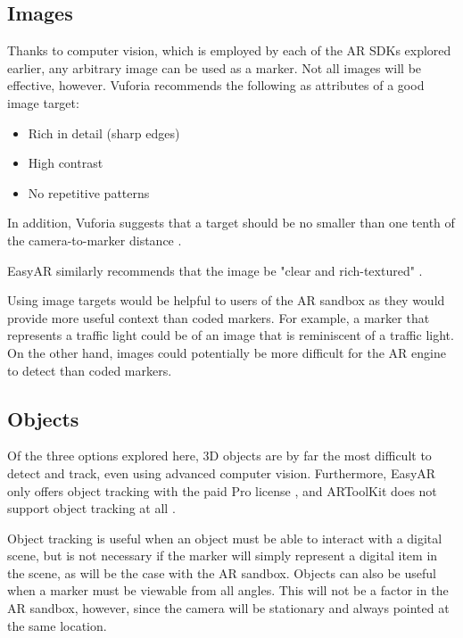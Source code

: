 \documentclass[letterpaper, 10pt, onecolumn, draftclsnofoot]{IEEEtran}
\begin{document}
\subsection{Images}
Thanks to computer vision, which is employed by each of the AR SDKs explored earlier, any arbitrary image can be used as a marker. Not all images will be effective, however. Vuforia recommends the following as attributes of a good image target:
\begin{itemize}
    \item Rich in detail (sharp edges)
    \item High contrast
    \item No repetitive patterns
\end{itemize}
In addition, Vuforia suggests that a target should be no smaller than one tenth of the camera-to-marker distance \cite{vuforia-images}.

EasyAR similarly recommends that the image be "clear and rich-textured" \cite{easyar-images}.

Using image targets would be helpful to users of the AR sandbox as they would provide more useful context than coded markers. For example, a marker that represents a traffic light could be of an image that is reminiscent of a traffic light. On the other hand, images could potentially be more difficult for the AR engine to detect than coded markers.

\subsection{Objects}
Of the three options explored here, 3D objects are by far the most difficult to detect and track, even using advanced computer vision. Furthermore, EasyAR only offers object tracking with the paid Pro license \cite{easyar-prices}, and ARToolKit does not support object tracking at all \cite{artoolkit-features}.

Object tracking is useful when an object must be able to interact with a digital scene, but is not necessary if the marker will simply represent a digital item in the scene, as will be the case with the AR sandbox. Objects can also be useful when a marker must be viewable from all angles. This will not be a factor in the AR sandbox, however, since the camera will be stationary and always pointed at the same location.
\end{document}
